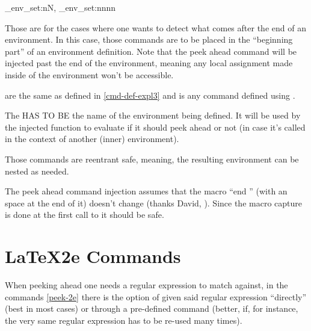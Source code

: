 \documentclass[10pt]{article}
\begin{document}
\begin{codedescribe}{\xpeekahead_env_set:nN, \xpeekahead_env_set:nnnn}
\begin{codesyntax}%
\end{codesyntax}
Those are for the cases where one wants to detect what comes after the end of an environment. In this case, those commands are to be placed in the ``beginning part'' of an environment definition. Note that the peek ahead command will be injected past the end of the environment, meaning any local assignment made inside of the environment won't be accessible. 

 are the same as defined in \ref{cmd-def-expl3} and  is any command defined using .
\end{codedescribe}
\begin{tsremark}
  The  HAS TO BE the name of the environment being defined. It will be used by the injected function to evaluate if it should peek ahead or not (in case it's called in the context of another  (inner) environment).
\end{tsremark}
\begin{tsremark}
  Those commands are reentrant safe, meaning, the resulting environment can be nested as needed.
\end{tsremark}
\begin{tsremark}
  The peek ahead command injection assumes that the macro ``end '' (with an space at the end of it) doesn't change (thanks David, \cite{stackexchange}). Since the macro capture is done at the first call to  it should be safe.
\end{tsremark}

\newpage

\section{LaTeX2e Commands}\label{2e-cmds}
When peeking ahead one needs a regular expression to match against, in the commands \ref{peek-2e}  there is the option of given said regular expression ``directly'' (best in most cases) or through a pre-defined command (better, if, for instance, the very same regular expression has to be re-used many times).
\end{document}
